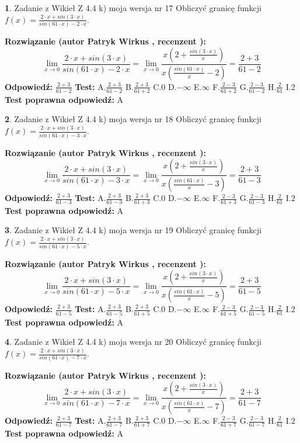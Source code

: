 \documentclass[12pt, a4paper]{article}
\theoremstyle{definition} %
\newtheorem{zad}{}
\newcommand{\zadStart}[1]{\begin{zad}#1\newline}
\newcommand{\zadStop}{\end{zad}}
\newcommand{\rozwStart}[2]{\noindent \textbf{Rozwiązanie (autor #1 , recenzent #2): }\newline}
\newcommand{\rozwStop}{\newline}
\newcommand{\odpStart}{\noindent \textbf{Odpowiedź:}\newline}
\newcommand{\odpStop}{\newline}
\newcommand{\testStart}{\noindent \textbf{Test:}\newline}
\newcommand{\testStop}{\newline}
\newcommand{\kluczStart}{\noindent \textbf{Test poprawna odpowiedź:}\newline}
\newcommand{\kluczStop}{\newline}
\begin{document}
\zadStart{Zadanie z Wikieł Z 4.4 k) moja wersja nr 17}
Obliczyć granicę funkcji $f(x)=\frac{2\cdot x +sin(3\cdot x)}{sin(61\cdot x) -2\cdot x}$.
\zadStop
\rozwStart{Patryk Wirkus}{}
$$\lim\limits_{x\to 0}\frac{2\cdot x +sin(3\cdot x)}{sin(61\cdot x) -2\cdot x}
=\lim\limits_{x\to 0}\frac{x(2+\frac{sin(3\cdot x)}{x})}{x(\frac{sin(61\cdot x)}{x}-2)}
=\frac{2+3}{61-2}$$
\rozwStop
\odpStart
$\frac{2+3}{61-2}$
\odpStop
\testStart
A.$\frac{2+3}{61-2}$
B.$\frac{2+3}{61+2}$
C.$0$
D.$-\infty$
E.$\infty$
F.$\frac{2-3}{61+2}$
G.$\frac{2-3}{61-2}$
H.$\frac{2}{61}$
I.$2$
\testStop
\kluczStart
A
\kluczStop



\zadStart{Zadanie z Wikieł Z 4.4 k) moja wersja nr 18}
Obliczyć granicę funkcji $f(x)=\frac{2\cdot x +sin(3\cdot x)}{sin(61\cdot x) -3\cdot x}$.
\zadStop
\rozwStart{Patryk Wirkus}{}
$$\lim\limits_{x\to 0}\frac{2\cdot x +sin(3\cdot x)}{sin(61\cdot x) -3\cdot x}
=\lim\limits_{x\to 0}\frac{x(2+\frac{sin(3\cdot x)}{x})}{x(\frac{sin(61\cdot x)}{x}-3)}
=\frac{2+3}{61-3}$$
\rozwStop
\odpStart
$\frac{2+3}{61-3}$
\odpStop
\testStart
A.$\frac{2+3}{61-3}$
B.$\frac{2+3}{61+3}$
C.$0$
D.$-\infty$
E.$\infty$
F.$\frac{2-3}{61+3}$
G.$\frac{2-3}{61-3}$
H.$\frac{2}{61}$
I.$2$
\testStop
\kluczStart
A
\kluczStop



\zadStart{Zadanie z Wikieł Z 4.4 k) moja wersja nr 19}
Obliczyć granicę funkcji $f(x)=\frac{2\cdot x +sin(3\cdot x)}{sin(61\cdot x) -5\cdot x}$.
\zadStop
\rozwStart{Patryk Wirkus}{}
$$\lim\limits_{x\to 0}\frac{2\cdot x +sin(3\cdot x)}{sin(61\cdot x) -5\cdot x}
=\lim\limits_{x\to 0}\frac{x(2+\frac{sin(3\cdot x)}{x})}{x(\frac{sin(61\cdot x)}{x}-5)}
=\frac{2+3}{61-5}$$
\rozwStop
\odpStart
$\frac{2+3}{61-5}$
\odpStop
\testStart
A.$\frac{2+3}{61-5}$
B.$\frac{2+3}{61+5}$
C.$0$
D.$-\infty$
E.$\infty$
F.$\frac{2-3}{61+5}$
G.$\frac{2-3}{61-5}$
H.$\frac{2}{61}$
I.$2$
\testStop
\kluczStart
A
\kluczStop



\zadStart{Zadanie z Wikieł Z 4.4 k) moja wersja nr 20}
Obliczyć granicę funkcji $f(x)=\frac{2\cdot x +sin(3\cdot x)}{sin(61\cdot x) -7\cdot x}$.
\zadStop
\rozwStart{Patryk Wirkus}{}
$$\lim\limits_{x\to 0}\frac{2\cdot x +sin(3\cdot x)}{sin(61\cdot x) -7\cdot x}
=\lim\limits_{x\to 0}\frac{x(2+\frac{sin(3\cdot x)}{x})}{x(\frac{sin(61\cdot x)}{x}-7)}
=\frac{2+3}{61-7}$$
\rozwStop
\odpStart
$\frac{2+3}{61-7}$
\odpStop
\testStart
A.$\frac{2+3}{61-7}$
B.$\frac{2+3}{61+7}$
C.$0$
D.$-\infty$
E.$\infty$
F.$\frac{2-3}{61+7}$
G.$\frac{2-3}{61-7}$
H.$\frac{2}{61}$
I.$2$
\testStop
\kluczStart
A
\kluczStop
\end{document}
